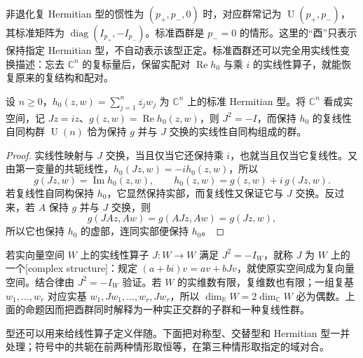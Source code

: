 非退化复 Hermitian 型的惯性为 \((p_+,p_-,0)\) 时，对应群常记为 \(\operatorname U(p_+,p_-)\)，其标准矩阵为 \(\operatorname{diag}(I_{p_+},-I_{p_-})\)。标准酉群是 \(p_-=0\) 的情形。这里的“酉”只表示保持指定 Hermitian 型，不自动表示该型正定。标准酉群还可以完全用实线性变换描述：忘去 \(\mathbb C^n\) 的复标量后，保留实配对 \(\operatorname{Re}h_0\) 与乘 \(i\) 的实线性算子，就能恢复原来的复结构和配对。

\begin{proposition}\label{b2:prop:unitary-real-complex-structure}
	设 \(n\ge0\)，\(h_0(z,w)=\sum_{j=1}^n\overline{z_j}w_j\) 为 \(\mathbb C^n\) 上的标准 Hermitian 型。将 \(\mathbb C^n\) 看成实空间，记 \(Jz=iz\)、\(g(z,w)=\operatorname{Re}h_0(z,w)\)，则 \(J^2=-I\)，而保持 \(h_0\) 的复线性自同构群 \(\operatorname U(n)\) 恰为保持 \(g\) 并与 \(J\) 交换的实线性自同构组成的群。
\end{proposition}
\begin{proof}
	实线性映射与 \(J\) 交换，当且仅当它还保持乘 \(i\)，也就当且仅当它复线性。又由第一变量的共轭线性，\(h_0(Jz,w)=-i h_0(z,w)\)，所以
	\[
		g(Jz,w)=\operatorname{Im}h_0(z,w),\qquad h_0(z,w)=g(z,w)+i\,g(Jz,w).
	\]
	若复线性自同构保持 \(h_0\)，它显然保持实部，而复线性又保证它与 \(J\) 交换。反过来，若 \(A\) 保持 \(g\) 并与 \(J\) 交换，则
	\[
		g(JAz,Aw)=g(AJz,Aw)=g(Jz,w),
	\]
	所以它也保持 \(h_0\) 的虚部，连同实部便保持 \(h_0\)。
\end{proof}

若实向量空间 \(W\) 上的实线性算子 \(J:W\to W\) 满足 \(J^2=-I_W\)，就称 \(J\) 为 \(W\) 上的一个[complex structure]：规定 \((a+bi)v=av+bJv\)，就使原实空间成为复向量空间。结合律由 \(J^2=-I_W\) 验证。若 \(W\) 的实维数有限，复维数也有限；一组复基 \(w_1,\ldots,w_r\) 对应实基 \(w_1,Jw_1,\ldots,w_r,Jw_r\)，所以 \(\dim_{\mathbb R}W=2\dim_{\mathbb C}W\) 必为偶数。上面的命题因而把酉群同时解释为一种实正交群的子群和一种复线性群。

\ProseParagraphBreak
型还可以用来给线性算子定义伴随。下面把对称型、交替型和 Hermitian 型一并处理；符号中的共轭在前两种情形取恒等，在第三种情形取指定的域对合。

